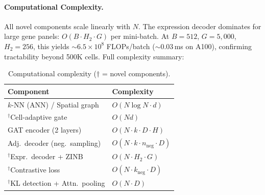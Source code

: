 \documentclass{article}
\begin{document}
\paragraph{Computational Complexity.} All novel components scale linearly with $N$. The expression decoder dominates for large gene panels: $O(B \cdot H_2 \cdot G)$ per mini-batch. At $B{=}512$, $G{=}5{,}000$, $H_2{=}256$, this yields ${\sim}6.5 \times 10^8$ FLOPs/batch (${\sim}0.03$\,ms on A100), confirming tractability beyond 500K cells. Full complexity summary:

\begin{table}[h]
\centering
\caption{Computational complexity ($\dagger$ = novel components).}
\label{tab:complexity}
\small
\begin{tabular}{@{}ll@{}}
\toprule
\textbf{Component} & \textbf{Complexity} \\
\midrule
$k$-NN (ANN) / Spatial graph & $O(N \log N \cdot d)$ \\
$^\dagger$Cell-adaptive gate & $O(Nd)$ \\
GAT encoder (2 layers) & $O(N \cdot k \cdot D \cdot H)$ \\
Adj.\ decoder (neg.\ sampling) & $O(N \cdot k \cdot n_{\text{neg}} \cdot D)$ \\
$^\dagger$Expr.\ decoder + ZINB & $O(N \cdot H_2 \cdot G)$ \\
$^\dagger$Contrastive loss & $O(N \cdot k_{\text{neg}} \cdot D)$ \\
$^\dagger$KL detection + Attn.\ pooling & $O(N \cdot D)$ \\
\bottomrule
\end{tabular}
\end{table}





\end{document}
